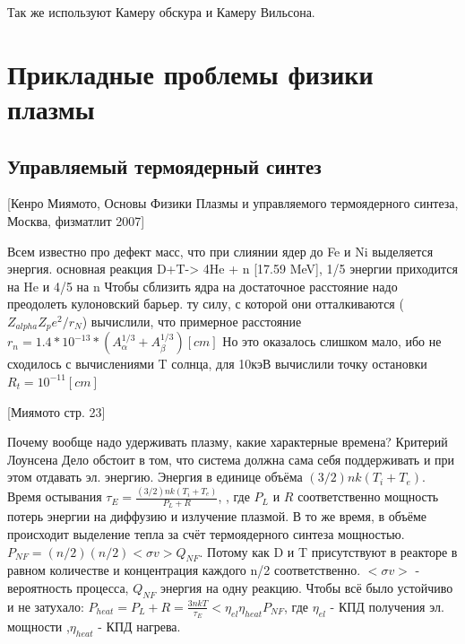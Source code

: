 \documentclass[10pt, a4paper]{article}
\begin{document}
\begin{figure}[h!]
\end{figure}

Так же используют Камеру обскура и Камеру Вильсона.

\section{Прикладные проблемы физики плазмы}
\label{sec.14}


\subsection{Управляемый термоядерный синтез}
\label{14}

[Кенро Миямото, Основы Физики Плазмы и управляемого термоядерного синтеза, Москва, физматлит 2007]

Всем известно про дефект масс, что при слиянии ядер до Fe и Ni выделяется энергия.
основная реакция D+T-> 4He + n [17.59 MeV], 1/5 энергии приходится на He и 4/5 на n
Чтобы сблизить ядра на достаточное расстояние надо преодолеть кулоновский барьер. ту силу, с которой они отталкиваются ($Z_{alpha}Z_p e^2/r_N$) вычислили, что примерное расстояние $r_{n}=1.4*10^{-13}*(A^{1/3}_{\alpha}+A^{1/3}_{\beta}) [cm]$ Но это оказалось слишком мало, ибо не сходилось с вычислениями T солнца, для 10кэВ вычислили точку остановки $R_t=10^{-11} [cm]$

[Миямото стр. 23]

Почему вообще надо удерживать плазму, какие характерные времена? Критерий Лоунсена 
Дело обстоит в том, что система должна сама себя поддерживать и при этом отдавать эл. энергию. Энергия в единице объёма $(3/2)nk(T_i+T_e)$. Время остывания $\tau_E = \frac { (3/2)nk(T_i+T_e) }{P_L+R}$, , где $P_L$ и $R$ соответственно мощность потерь энергии на диффузию и излучение плазмой. В то же время, в объёме происходит выделение тепла за счёт термоядерного синтеза мощностью. $P_{NF}=(n/2)(n/2)<\sigma v> Q_{NF} $. Потому
 как D и T присутствуют в реакторе в равном количестве и концентрация каждого n/2 соответственно. $<\sigma v> $ - вероятность процесса,   $Q_{NF} $ энергия на одну реакцию.
Чтобы всё было устойчиво и не затухало: $P_{heat}=P_L + R = \frac{3nkT}{\tau_E} < \eta_{el} \eta_{heat} P_{NF} $, где $\eta_{el} $ - КПД получения эл. мощности ,$ \eta_{heat} $ - КПД нагрева.
\end{document}
